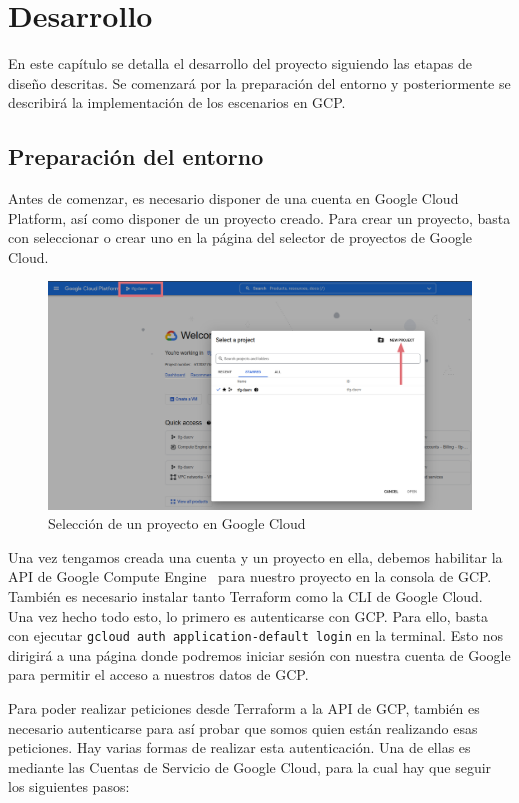 \chapter{Desarrollo} \label{ch:des}
En este capítulo se detalla el desarrollo del proyecto siguiendo las etapas de diseño descritas. Se comenzará por la preparación del entorno y posteriormente se describirá la implementación de los escenarios en GCP.

\section{Preparación del entorno} \label{sec:prep}
  Antes de comenzar, es necesario disponer de una cuenta en Google Cloud Platform, así como disponer de un proyecto creado. Para crear un proyecto, basta con seleccionar o crear uno en la página del selector de proyectos de Google Cloud. 

  \begin{figure}[h]
  \centering
  \includegraphics[width=\textwidth]{../imgs/desarrollo/entorno/project.png}
  \caption{Selección de un proyecto en Google Cloud}
  \label{fig:ent1}
  \end{figure}

  Una vez tengamos creada una cuenta y un proyecto en ella, debemos habilitar la API de Google Compute Engine~\cite{des1} para nuestro proyecto en la consola de GCP. También es necesario instalar tanto Terraform como la CLI de Google Cloud. Una vez hecho todo esto, lo primero es autenticarse con GCP. Para ello, basta con ejecutar \texttt{gcloud auth application-default login} en la terminal. Esto nos dirigirá a una página donde podremos iniciar sesión con nuestra cuenta de Google para permitir el acceso a nuestros datos de GCP.

  Para poder realizar peticiones desde Terraform a la API de GCP, también es necesario autenticarse para así probar que somos quien están realizando esas peticiones. Hay varias formas de realizar esta autenticación. Una de ellas es mediante las Cuentas de Servicio de Google Cloud, para la cual hay que seguir los siguientes pasos:

